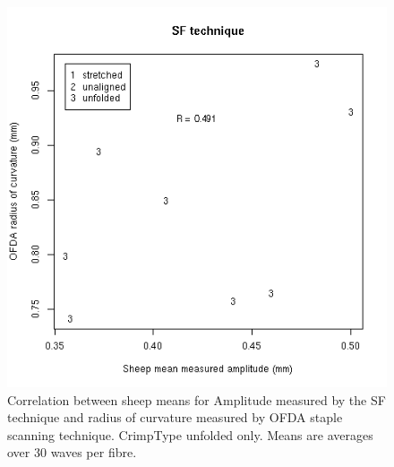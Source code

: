%

\begin{figure}[!h]
  \centering
  \includegraphics[width=1.0\textwidth]{figofdaradsfamplunfold.png}
  \caption{Correlation between sheep means for Amplitude measured by the SF technique and radius of curvature measured by OFDA staple scanning technique. CrimpType unfolded only. Means are averages over 30 waves per fibre.}
  \label{fig:ofdaradsfamplunfold}
\end{figure}

%

